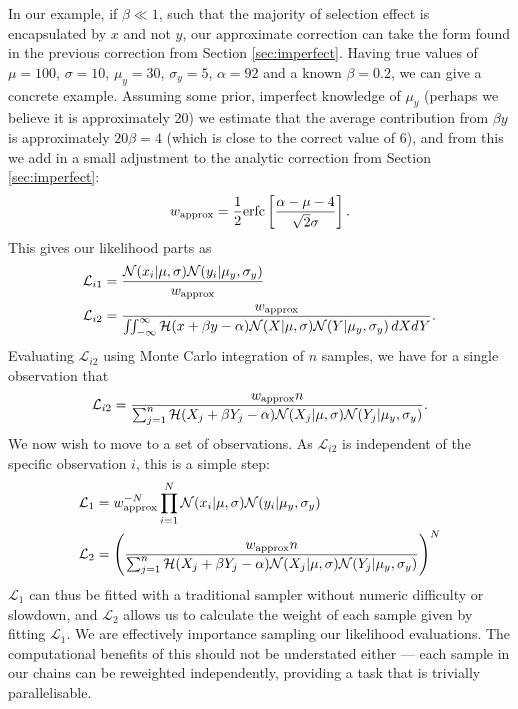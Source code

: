 \documentclass[a4paper,fleqn,usenatbib]{mnras}
\begin{document}
In our example, if $\beta \ll 1$, such that the majority of selection effect is encapsulated by $x$ and not $y$, our approximate correction can take the form found in the previous correction from Section \ref{sec:imperfect}. Having true values of $\mu = 100$, $\sigma = 10$, $\mu_y = 30$, $\sigma_y = 5$, $\alpha=92$ and a known $\beta = 0.2$, we can give a concrete example. Assuming some prior, imperfect knowledge of $\mu_y$ (perhaps we believe it is approximately $20$) we estimate that the average contribution from $\beta y$ is approximately $20\beta = 4$ (which is close to the correct value of $6$), and from this we add in a small adjustment to the analytic correction from Section \ref{sec:imperfect}:
\begin{align}
w_{\rm approx} = \frac{1}{2} {\rm erfc}\left[ \frac{\alpha - \mu - 4}{\sqrt{2}\sigma} \right].
\end{align}
This gives our likelihood parts as
\begin{align}
\mathcal{L}_{i1} &= \frac{ \mathcal{N}(x_i|\mu, \sigma) \mathcal{N}(y_i|\mu_y, \sigma_y)}{w_{\rm approx} } \\
\mathcal{L}_{i2} &= \frac{ w_{\rm approx}  }{\iint_{-\infty}^\infty \mathcal{H}(x + \beta y - \alpha) \mathcal{N}(X|\mu, \sigma) \mathcal{N}(Y|\mu_y, \sigma_y)\, dX dY}.
\end{align}
Evaluating $\mathcal{L}_{i2}$ using Monte Carlo integration of $n$ samples, we have for a single observation that
\begin{align}
\mathcal{L}_{i2} = \frac{ w_{\rm approx}  n }{\sum_{j=1}^{n} \mathcal{H}(X_j + \beta Y_j - \alpha) \mathcal{N}(X_j|\mu, \sigma) \mathcal{N}(Y_j|\mu_y, \sigma_y)} \label{eq:mc}.
\end{align}
We now wish to move to a set of observations. As $\mathcal{L}_{i2}$ is independent of the specific observation $i$, this is a simple step:
\begin{align}
\mathcal{L}_1 &= w_{\rm approx}^{-N} \prod_{i=1}^N \mathcal{N}(x_i|\mu, \sigma) \mathcal{N}(y_i|\mu_y, \sigma_y) \\
\mathcal{L}_{2} &= \left(  \frac{ w_{\rm approx}  n }{\sum_{j=1}^{n} \mathcal{H}(X_j + \beta Y_j - \alpha) \mathcal{N}(X_j|\mu, \sigma) \mathcal{N}(Y_j|\mu_y, \sigma_y)}\right)^N
\end{align}
$\mathcal{L}_1$ can thus be fitted with a traditional sampler without numeric difficulty or slowdown, and $\mathcal{L}_2$ allows us to calculate the weight of each sample given by fitting $\mathcal{L}_{1}$. We are effectively importance sampling our likelihood evaluations. The computational benefits of this should not be understated either --- each sample in our chains can be reweighted independently, providing a task that is trivially parallelisable. 
\end{document}
